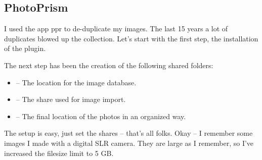 

\subsection{PhotoPrism}

I used the app \gls{ppr} to de-duplicate my images. The last 15 years a lot of
duplicates blowed up the collection. Let's start with the first step, the
installation of the plugin.


The next step has been the creation of the following shared folders:

\begin{itemize}
    \item {} -- The location for the image database.
    \item {} -- The share used for image import.
    \item {}  -- The final location of the photos in an organized way.
\end{itemize}


The setup is easy, just set the shares -- that's all folks. Okay -- I remember
some images I made with a digital SLR camera. They are large as I remember, so
I've increased the filesize limit to 5 GB.

